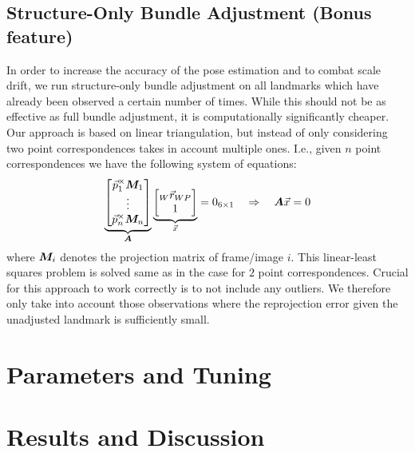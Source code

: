 \documentclass[11pt]{article}
\newcommand{\mat}{\matrixsym}
\begin{document}
\subsection{Structure-Only Bundle Adjustment (Bonus feature)}
In order to increase the accuracy of the pose estimation and to combat scale drift, we run structure-only bundle adjustment on all landmarks which have already been observed a certain number of times. While this should not be as effective as full bundle adjustment, it is computationally significantly cheaper.\\
Our approach is based on linear triangulation, but instead of only considering two point correspondences takes in account multiple ones. I.e., given $n$ point correspondences we have the following system of equations:
\begin{equation*}
\underbrace{\begin{bmatrix} \vec{p}_1^\times \mat{M}_1\\ \vdots \\ \vec{p}_n^\times \mat{M}_n \end{bmatrix}}_{\mat{A}} \underbrace{\begin{bmatrix} {}_W\vec{r}_{WP} \\ 1 \end{bmatrix}}_{\vec{x}} = 0_{6 \times 1} \quad \Rightarrow \quad \mat{A} \vec{x} = 0
\end{equation*}
where $\mat{M}_i$ denotes the projection matrix of frame/image $i$. This linear-least squares problem is solved same as in the case for $2$ point correspondences. Crucial for this approach to work correctly is to not include any outliers. We therefore only take into account those observations where the reprojection error given the unadjusted landmark is sufficiently small. 

\section{Parameters and Tuning}

\section{Results and Discussion}
\end{document}
